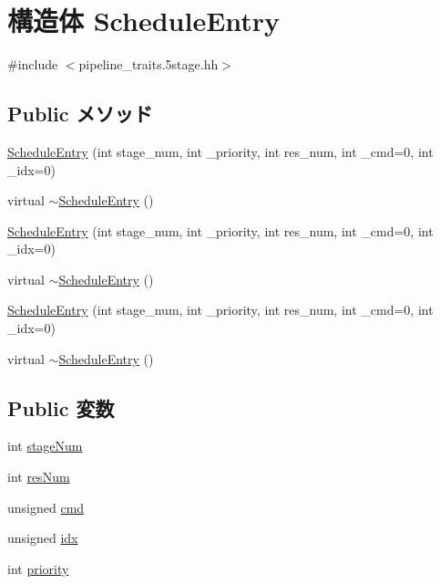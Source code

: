 \hypertarget{structThePipeline_1_1ScheduleEntry}{
\section{構造体 ScheduleEntry}
\label{structThePipeline_1_1ScheduleEntry}
}


{\ttfamily \#include $<$pipeline\_\-traits.5stage.hh$>$}\subsection*{Public メソッド}
\begin{DoxyCompactItemize}
\item 
\hyperlink{structThePipeline_1_1ScheduleEntry_a39f5765d7267f4eed1690e3c3476d2ef}{ScheduleEntry} (int stage\_\-num, int \_\-priority, int res\_\-num, int \_\-cmd=0, int \_\-idx=0)
\item 
virtual \hyperlink{structThePipeline_1_1ScheduleEntry_af29b983aaf5026d418a9e6a126388bb1}{$\sim$ScheduleEntry} ()
\item 
\hyperlink{structThePipeline_1_1ScheduleEntry_a39f5765d7267f4eed1690e3c3476d2ef}{ScheduleEntry} (int stage\_\-num, int \_\-priority, int res\_\-num, int \_\-cmd=0, int \_\-idx=0)
\item 
virtual \hyperlink{structThePipeline_1_1ScheduleEntry_af29b983aaf5026d418a9e6a126388bb1}{$\sim$ScheduleEntry} ()
\item 
\hyperlink{structThePipeline_1_1ScheduleEntry_a39f5765d7267f4eed1690e3c3476d2ef}{ScheduleEntry} (int stage\_\-num, int \_\-priority, int res\_\-num, int \_\-cmd=0, int \_\-idx=0)
\item 
virtual \hyperlink{structThePipeline_1_1ScheduleEntry_af29b983aaf5026d418a9e6a126388bb1}{$\sim$ScheduleEntry} ()
\end{DoxyCompactItemize}
\subsection*{Public 変数}
\begin{DoxyCompactItemize}
\item 
int \hyperlink{structThePipeline_1_1ScheduleEntry_a9da7aa2f94c428eaed5adad96a6ab151}{stageNum}
\item 
int \hyperlink{structThePipeline_1_1ScheduleEntry_a4c6490c35efbfff10461ec4e6d0b0717}{resNum}
\item 
unsigned \hyperlink{structThePipeline_1_1ScheduleEntry_ab3d2004723874364229cf4339bb129fb}{cmd}
\item 
unsigned \hyperlink{structThePipeline_1_1ScheduleEntry_aef726673a09d801a40682410390442cf}{idx}
\item 
int \hyperlink{structThePipeline_1_1ScheduleEntry_acec9ce2df15222151ad66fcb1d74eb9f}{priority}
\end{DoxyCompactItemize}



